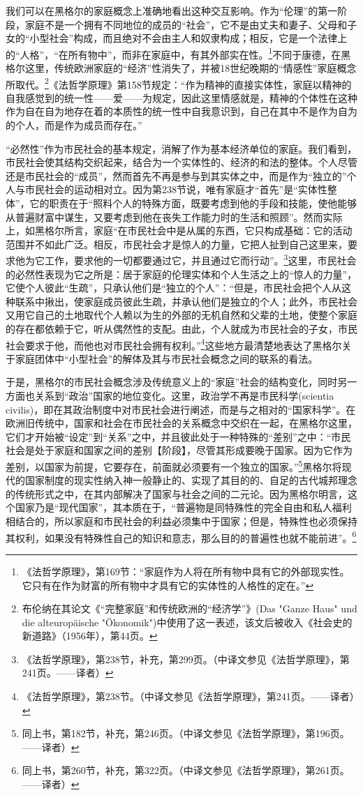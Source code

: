 我们可以在黑格尔的家庭概念上准确地看出这种交互影响。作为“伦理”的第一阶段，家庭不是一个拥有不同地位的成员的“社会”，它不是由丈夫和妻子、父母和子女的“小型社会”构成，而且绝对不会由主人和奴隶构成；相反，它是一个法律上的“人格”，“在所有物中”，而非在家庭中，有其外部实在性。\footnote{《法哲学原理》，第169节：“家庭作为人将在所有物中具有它的外部现实性。它只有在作为财富的所有物中才具有它的实体性的人格性的定在。”}不同于康德，在黑格尔这里，传统欧洲家庭的“经济”性消失了，并被18世纪晚期的“情感性”家庭概念所取代。\footnote{布伦纳在其论文《“完整家庭”和传统欧洲的“经济学”》(Das "Ganze Haus" und die alteuropäische "Ökonomik")中使用了这一表述，该文后被收入《社会史的新道路》（1956年），第44页。}《法哲学原理》第158节规定：“作为精神的直接实体性，家庭以精神的自我感觉到的统一性——爱——为规定，因此这里情感就是，精神的个体性在这种作为自在自为地存在着的本质性的统一性中自我意识到，自己在其中不是作为自为的个人，而是作为成员而存在。”

“必然性”作为市民社会的基本规定，消解了作为基本经济单位的家庭。我们看到，市民社会使其结构交织起来，结合为一个实体性的、经济的和法的整体。个人尽管还是市民社会的“成员”，然而首先不再是参与到其实体之中，而是作为“独立的”个人与市民社会的运动相对立。因为第238节说，唯有家庭才“首先”是“实体性整体”，它的职责在于“照料个人的特殊方面，既要考虑到他的手段和技能，使他能够从普遍财富中谋生，又要考虑到他在丧失工作能力时的生活和照顾”。然而实际上，如黑格尔所言，家庭“在市民社会中是从属的东西，它只构成基础：它的活动范围并不如此广泛。相反，市民社会才是惊人的力量，它把人扯到自己这里来，要求他为它工作，要求他的一切都要通过它，并且通过它而行动”。\footnote{《法哲学原理》，第238节，补充，第299页。（中译文参见《法哲学原理》，第241页。——译者）}这里，市民社会的必然性表现为它之所是：居于家庭的伦理实体和个人生活之上的“惊人的力量”，它使个人彼此“生疏”，只承认他们是“独立的个人”：“但是，市民社会把个人从这种联系中揪出，使家庭成员彼此生疏，并承认他们是独立的个人；此外，市民社会又用它自己的土地取代个人赖以为生的外部的无机自然和父辈的土地，使整个家庭的存在都依赖于它，听从偶然性的支配。由此，个人就成为市民社会的子女，市民社会要求于他，而他也对市民社会拥有权利。”\footnote{《法哲学原理》，第238节。（中译文参见《法哲学原理》，第241页。——译者）}这些地方最清楚地表达了黑格尔关于家庭团体中“小型社会”的解体及其与市民社会概念之间的联系的看法。

于是，黑格尔的市民社会概念涉及传统意义上的“家庭”社会的结构变化，同时另一方面也关系到“政治”国家的地位变化。这里，政治学不再是市民科学(scientia civilis)，即在其政治制度中对市民社会进行阐述，而是与之相对的“国家科学”。在欧洲旧传统中，国家和社会在市民社会的关系概念中交织在一起，在黑格尔这里，它们才开始被“设定”到“关系”之中，并且彼此处于一种特殊的“差别”之中：“市民社会是处于家庭和国家之间的差别【阶段】，尽管其形成要晚于国家。因为它作为差别，以国家为前提，它要存在，前面就必须要有一个独立的国家。”\footnote{同上书，第182节，补充，第246页。（中译文参见《法哲学原理》，第196页。——译者）}黑格尔将现代的国家制度的现实性纳入神一般静止的、实现了其目的的、自足的古代城邦理念的传统形式之中，在其内部解决了国家与社会之间的二元论。因为黑格尔明言，这个国家乃是“现代国家”，其本质在于，“普遍物是同特殊性的完全自由和私人福利相结合的，所以家庭和市民社会的利益必须集中于国家；但是，特殊性也必须保持其权利，如果没有特殊性自己的知识和意志，那么目的的普遍性也就不能前进”。\footnote{同上书，第260节，补充，第322页。（中译文参见《法哲学原理》，第261页。——译者）}

